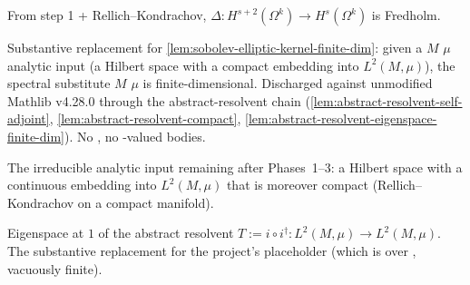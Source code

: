 \begin{lemma}
\label{lem:sobolev-fredholm-property}
From step 1 + Rellich--Kondrachov, $\Delta : H^{s+2}(\Omega^{k}) \to H^{s}(\Omega^{k})$ is Fredholm.
\leanok
\end{lemma}


\begin{lemma}
\label{lem:sobolev-elliptic-overview-substantive}
Substantive replacement for \ref{lem:sobolev-elliptic-kernel-finite-dim}: given a
 $M$ $\mu$ analytic input (a Hilbert space
 with a compact embedding into $L^{2}(M, \mu)$), the
spectral substitute  $M$ $\mu$ is
finite-dimensional.  Discharged against unmodified Mathlib v4.28.0
through the abstract-resolvent chain
(\ref{lem:abstract-resolvent-self-adjoint},
\ref{lem:abstract-resolvent-compact},
\ref{lem:abstract-resolvent-eigenspace-finite-dim}).  No
, no -valued bodies.
\leanok
\end{lemma}

\begin{lemma}
\label{lem:has-laplace-resolvent-class}
The irreducible analytic input remaining after Phases~1--3:
a Hilbert space  with a continuous embedding into
$L^{2}(M, \mu)$ that is moreover compact (Rellich--Kondrachov on a
compact manifold).
\leanok
\end{lemma}

\begin{lemma}
\label{lem:real-harmonic-def}
Eigenspace at $1$ of the abstract resolvent
$T := i \circ i^{\dagger} : L^{2}(M, \mu) \to L^{2}(M, \mu)$.
The substantive replacement for the project's placeholder
 (which is  over
, vacuously finite).
\leanok
\end{lemma}

